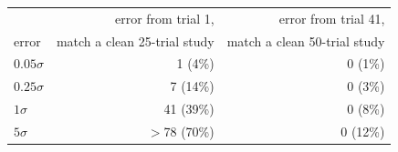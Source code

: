 \begin{tabular}{lrr}
\toprule
& error from trial 1, & error from trial 41, \\
error & match a clean 25-trial study & match a clean 50-trial study \\
\midrule
$0.05\sigma$ & 1 (4\%) & 0 (1\%) \\
$0.25\sigma$ & 7 (14\%) & 0 (3\%) \\
$1\sigma$ & 41 (39\%) & 0 (8\%) \\
$5\sigma$ & $>$78 (70\%) & 0 (12\%) \\
\bottomrule
\end{tabular}
